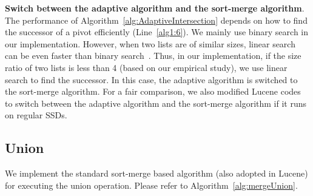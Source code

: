 \textbf{Switch between the adaptive algorithm and the sort-merge algorithm}. The performance of Algorithm~\ref{alg:AdaptiveIntersection} depends on how to find the successor of a pivot efficiently (Line~\ref{alg1:6}). We mainly use binary search in our implementation. However, when two lists are of similar sizes, linear search can be even faster than binary search~\cite{Ding2011}. Thus, in our implementation, if the size ratio of two lists is less than 4 (based on our empirical study), we use linear search to find the successor. In this case, the adaptive algorithm is switched to the sort-merge algorithm. For a fair comparison, we also modified Lucene codes to switch between the adaptive algorithm and the sort-merge algorithm if it runs on regular SSDs.


\subsection{Union}\label{sec:union}
We implement the standard sort-merge based algorithm (also adopted in Lucene) for executing the union operation. Please refer to Algorithm~\ref{alg:mergeUnion}.

